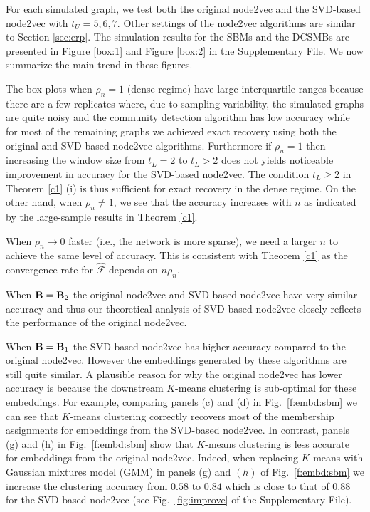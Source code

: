 \documentclass[10pt,journal,compsoc]{IEEEtran}
\newcommand{\bds}{\boldsymbol}
\newcommand{\M}[1]{{{\mathbf{\MakeUppercase{#1}}}}}
\numberwithin{equation}{section}
\begin{document}
For each simulated graph, we test both the original node2vec and the SVD-based node2vec with $t_U = 5,6,7$. Other settings of the node2vec algorithms are similar to Section \ref{sec:erp}. The simulation results for the SBMs and the DCSMBs are presented in
Figure \ref{box:1} and Figure \ref{box:2} in the Supplementary File. We now summarize the main trend in these figures.

\begin{itemize} 
\item {The box plots when $\rho_n = 1$ (dense regime) have large
  interquartile ranges because there are a few replicates where, due to sampling variability, the simulated graphs are quite noisy and the community detection algorithm has low accuracy while for most of the remaining graphs we achieved exact recovery using both the original and SVD-based node2vec algorithms. Furthermore if $\rho_n = 1$ then increasing the
  window size from $t_L = 2$ to $t_L > 2$ does not yields noticeable improvement in 
  accuracy for the SVD-based node2vec. The condition $t_L \geq 2$ in Theorem \ref{c1} (i) is thus sufficient for exact recovery in the dense regime. On the other hand, when $\rho_n\neq 1$, we see that the accuracy increases with $n$ as indicated by the large-sample results in Theorem \ref{c1}.
\item When $\rho_n \rightarrow 0$ faster (i.e., the network is more sparse), we need a larger $n$ to achieve the same level of accuracy. This is consistent with Theorem \ref{c1} as the convergence rate for $\hat{\bds{\mathcal{F}}}$ depends on $n \rho_n$. 
\item When $\M B = \M B_2$ the original node2vec and SVD-based node2vec have very similar accuracy and thus our theoretical analysis of SVD-based node2vec closely reflects the performance of the original node2vec. 
\item When $\M B = \M B_1$ the SVD-based node2vec has higher accuracy compared to the original node2vec. However the embeddings generated by these algorithms are still quite similar. A plausible reason for why the original node2vec has lower accuracy is because the downstream $K$-means clustering is sub-optimal for these embeddings. For example, comparing panels (c) and (d) in Fig.~\ref{f:embd:sbm} we can see that $K$-means clustering correctly recovers most of the membership assignments for embeddings from the SVD-based node2vec. In contrast, panels (g) and (h) in Fig.~\ref{f:embd:sbm} show that $K$-means clustering is less accurate for embeddings from the original node2vec. Indeed, when replacing $K$-means with Gaussian mixtures model (GMM) \cite{scrucca2016mclust,fraley2002model} in panels (g) and $(h)$ of Fig.~\ref{f:embd:sbm} we increase the clustering accuracy from $0.58$ to $0.84$ which is close to that of $0.88$ for the SVD-based node2vec (see Fig.~\ref{fig:improve} of the Supplementary File). }


\end{itemize}
\end{document}
